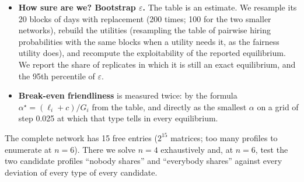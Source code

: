 \documentclass[10pt]{article}
\theoremstyle{plain}
\theoremstyle{definition}\newtheorem{definition}{Definition}
\begin{document}
\begin{itemize}
We solve two linear programs (HiGHS) for each of the three leak models: maximise and minimise the expected share of tells. If the two optima coincide, \emph{every} CCE --- hence every mixed
equilibrium and every limit of no-regret learning --- produces the same amount of sharing.
\item \textbf{How sure are we? Bootstrap $\varepsilon$.} The table is an estimate. We resample its 20 blocks of days with replacement (200 times; 100 for the two smaller networks), rebuild the
utilities (resampling the table of pairwise hiring probabilities with the same blocks when a utility needs it, as the fairness utility does), and recompute the exploitability of the reported equilibrium. We report the share of replicates in which it is still an exact equilibrium, and the 95th percentile of $\varepsilon$.
\item \textbf{Break-even friendliness} is measured twice: by the formula $\alpha^\star=(\ell_i+c)/G_i$ from the table, and directly as the smallest $\alpha$ on a
grid of step 0.025 at which that type tells in every equilibrium.
\end{itemize}
The complete network has 15 free entries ($2^{15}$ matrices; too many profiles to enumerate at $n=6$). There we solve $n=4$ exhaustively and, at $n=6$, test the two candidate
profiles ``nobody shares'' and ``everybody shares'' against every deviation of every type of every candidate.
\end{document}

